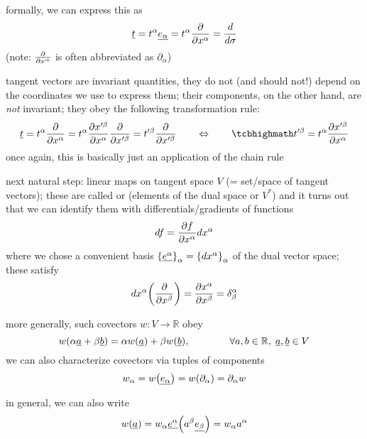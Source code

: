 formally, we can express this as
\begin{equation}
\underline{t} = t^\alpha \underline{e_\alpha} = t^\alpha \pdv{x^\alpha} = \dv{\sigma}
\end{equation}
(note: $\pdv{x^\alpha}$ is often abbreviated as $\partial_\alpha$)


tangent vectors are invariant quantities, they do not (and should not!) depend on the coordinates we use to express them; their components, on the other hand, are \emph{not} invariant; they obey the following transformation rule:
\begin{equation}\label{eq:vec_trafo}
\underline{t} = t^\alpha \pdv{x^\alpha} = t^\alpha \pdv{x'^\beta}{x^\alpha} \pdv{x'^\beta} = t'^\beta \pdv{x'^\beta}
\qquad \Leftrightarrow \qquad
\eqbox{
t'^\beta = t^\alpha \pdv{x'^\beta}{x^\alpha}
}
\end{equation}
once again, this is basically just an application of the chain rule


next natural step: linear maps on tangent space $V$ (= set/space of tangent vectors); these are called  or  (elements of the dual space or  $V^*$) and it turns out that we can identify them with differentials/gradients of functions
\begin{equation}
df = \pdv{f}{x^\alpha} dx^\alpha
\end{equation}
where we chose a convenient basis $\qty{\underline{e^\alpha}}_\alpha = \qty{dx^\alpha}_\alpha$ of the dual vector space; these satisfy
\begin{equation}
dx^\alpha\qty(\pdv{x^\beta}) = \pdv{x^\alpha}{x^\beta} = \delta^\alpha_\beta
\end{equation}

more generally, such covectors $w: V \rightarrow \mathbb{R}$ obey
\begin{equation}
w\qty(\alpha \underline{a} + \beta \underline{b}) = \alpha w\qty(\underline{a}) + \beta w\qty(\underline{b}), \qquad \qquad \forall a, b \in \mathbb{R}, \; \underline{a}, \underline{b} \in V
\end{equation}
we can also characterize covectors via tuples of components
\begin{equation}
w_\alpha = w\qty(\underline{e_\alpha}) = w\qty(\partial_\alpha) = \partial_\alpha w
\end{equation}

in general, we can also write
\begin{equation}
w\qty(\underline{a}) = w_\alpha \underline{e^\alpha}\qty(a^\beta \underline{e_\beta}) = w_\alpha a^\alpha
\end{equation}


